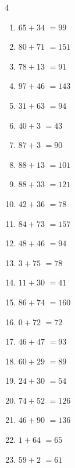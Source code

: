\begin{multicols}{4}
\begin{enumerate}
  \item $65+34$
        $=99$

  \item $80+71$
        $=151$

  \item $78+13$
        $=91$

  \item $97+46$
        $=143$

  \item $31+63$
        $=94$

  \item $40+3$
        $=43$

  \item $87+3$
        $=90$

  \item $88+13$
        $=101$

  \item $88+33$
        $=121$

  \item $42+36$
        $=78$

  \item $84+73$
        $=157$

  \item $48+46$
        $=94$

  \item $3+75$
        $=78$

  \item $11+30$
        $=41$

  \item $86+74$
        $=160$

  \item $0+72$
        $=72$

  \item $46+47$
        $=93$

\columnbreak %

  \item $60+29$
        $=89$

  \item $24+30$
        $=54$

  \item $74+52$
        $=126$

  \item $46+90$
        $=136$

  \item $1+64$
        $=65$

  \item $59+2$
        $=61$


\end{enumerate}
\end{multicols}
